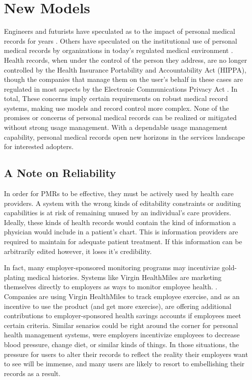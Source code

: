 \documentclass[10pt, conference, compsocconf]{IEEEtran}
\begin{document}
\section*{New Models}
Engineers and futurists have speculated as to the impact of personal medical records for years \cite{Emr:Web:BestCaseEMR,Emr:Web:WorstCaseEMR}.  Others have speculated on the institutional use of personal medical records by organizations in today's regulated medical environment \cite{Emr:doi:10.1056/NEJMc081118}.  Health records, when under the control of the person they address, are no longer controlled by the Health Insurance Portability and Accountability Act (HIPPA), though the companies that manage them on the user's behalf in these cases are regulated in most aspects by the Electronic Communications Privacy Act \cite{Emr:doi:10.1056/NEJMsb0800220}.  In total, These concerns imply certain requirements on robust medical record systems, making use models and record control more complex.  None of the promises or concerns of personal medical records can be realized or mitigated without strong usage management.  With a dependable usage management capability, personal medical records open new horizons in the services landscape for interested adopters.

\subsection*{A Note on Reliability}
In order for PMRs to be effective, they must be actively used by health care providers.  A system with the wrong kinds of editability constraints or auditing capabilities is at risk of remaining unused by an individual's care providers.  Ideally, these kinds of health records would contain the kind of information a physician would include in a patient's chart.  This is information providers are required to maintain for adequate patient treatment.  If this information can be arbitrarily edited however, it loses it's credibility.

In fact, many employer-sponsored monitoring programs may incentivize gold-plating medical histories.  Systems like Virgin HealthMiles are marketing themselves directly to employers as ways to monitor employee health. \cite{Emr:Web:VirginHealthMiles}.  Companies are using Virgin HealthMiles to track employee exercise, and as an incentive to use the product (and get more exercise), are offering additional contributions to employer-sponsored health savings accounts if employees meet certain criteria.  Similar senarios could be right around the corner for personal health management systems, were employers incentivize employees to decrease blood pressure, change diet, or similar kinds of things.  In those situations, the pressure for users to alter their records to reflect the reality their employers want to see will be immense, and many users are likely to resort to embellishing their records as a result.
\end{document}
